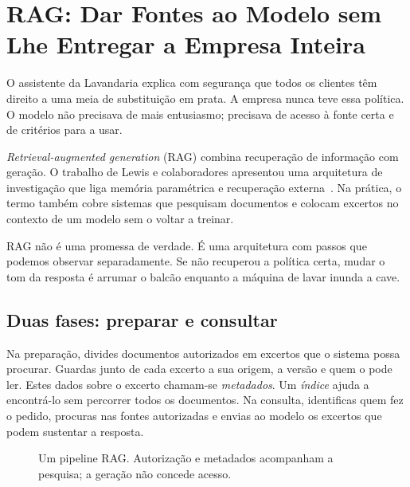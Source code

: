\chapter{RAG: Dar Fontes ao Modelo sem Lhe Entregar a Empresa Inteira}
\label{ch:rag}

\ficcao O assistente da Lavandaria explica com segurança que todos os clientes têm direito a uma meia de substituição em prata. A empresa nunca teve essa política. O modelo não precisava de mais entusiasmo; precisava de acesso à fonte certa e de critérios para a usar.

\emph{Retrieval-augmented generation} (RAG) combina recuperação de informação com geração. O trabalho de Lewis e colaboradores apresentou uma arquitetura de investigação que liga memória paramétrica e recuperação externa~\citep{lewis2020}. Na prática, o termo também cobre sistemas que pesquisam documentos e colocam excertos no contexto de um modelo sem o voltar a treinar.

RAG não é uma promessa de verdade. É uma arquitetura com passos que podemos observar separadamente. Se não recuperou a política certa, mudar o tom da resposta é arrumar o balcão enquanto a máquina de lavar inunda a cave.

\section{Duas fases: preparar e consultar}
Na preparação, divides documentos autorizados em excertos que o sistema possa procurar. Guardas junto de cada excerto a sua origem, a versão e quem o pode ler. Estes dados sobre o excerto chamam-se \emph{metadados}. Um \emph{índice} ajuda a encontrá-lo sem percorrer todos os documentos. Na consulta, identificas quem fez o pedido, procuras nas fontes autorizadas e envias ao modelo os excertos que podem sustentar a resposta.

\begin{figure}[htbp]
\centering
{}
\caption{Um pipeline RAG. Autorização e metadados acompanham a pesquisa; a geração não concede acesso.}
\label{fig:rag}
\end{figure}

